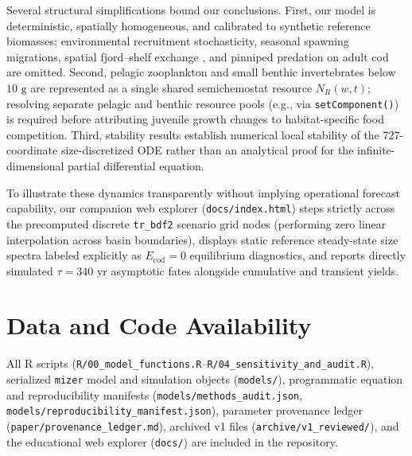 \documentclass[11pt,letterpaper]{article}
\begin{document}
Several structural simplifications bound our conclusions. First, our model is deterministic, spatially homogeneous, and calibrated to synthetic reference biomasses; environmental recruitment stochasticity, seasonal spawning migrations, spatial fjord--shelf exchange \citep{rose2011isolation}, and pinniped predation on adult cod \citep{swain2008predicted} are omitted. Second, pelagic zooplankton and small benthic invertebrates below $10\text{ g}$ are represented as a single shared semichemostat resource $N_R(w,t)$; resolving separate pelagic and benthic resource pools (e.g., via \texttt{setComponent()}) is required before attributing juvenile growth changes to habitat-specific food competition. Third, stability results establish numerical local stability of the 727-coordinate size-discretized ODE rather than an analytical proof for the infinite-dimensional partial differential equation.

To illustrate these dynamics transparently without implying operational forecast capability, our companion web explorer (\texttt{docs/index.html}) steps strictly across the precomputed discrete \texttt{tr\_bdf2} scenario grid nodes (performing zero linear interpolation across basin boundaries), displays static reference steady-state size spectra labeled explicitly as $E_{\mathrm{cod}} = 0$ equilibrium diagnostics, and reports directly simulated $\tau = 340\text{ yr}$ asymptotic fates alongside cumulative and transient yields.

\section*{Data and Code Availability}

All R scripts (\texttt{R/00\_\allowbreak model\_\allowbreak functions.R}--\texttt{R/04\_\allowbreak sensitivity\_\allowbreak and\_audit.R}), serialized \texttt{mizer} model and simulation objects (\texttt{models/}), programmatic equation and reproducibility manifests (\texttt{models/\allowbreak methods\_audit.json}, \texttt{models/\allowbreak reproducibility\_\allowbreak manifest.json}), parameter provenance ledger (\texttt{paper/\allowbreak provenance\_\allowbreak ledger.md}), archived v1 files (\texttt{archive/\allowbreak v1\_reviewed/}), and the educational web explorer (\texttt{docs/}) are included in the repository.



\end{document}
